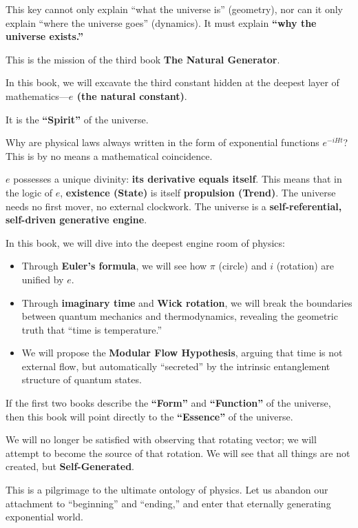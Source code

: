 \documentclass[11pt,a4paper,twoside]{book}
\begin{document}
This key cannot only explain ``what the universe is'' (geometry), nor can it only explain ``where the universe goes'' (dynamics). It must explain \textbf{``why the universe exists.''}

This is the mission of the third book \textbf{The Natural Generator}.

In this book, we will excavate the third constant hidden at the deepest layer of mathematics---\textbf{$e$ (the natural constant)}.

It is the \textbf{``Spirit''} of the universe.

Why are physical laws always written in the form of exponential functions $e^{-iHt}$? This is by no means a mathematical coincidence.

$e$ possesses a unique divinity: \textbf{its derivative equals itself}. This means that in the logic of $e$, \textbf{existence (State)} is itself \textbf{propulsion (Trend)}. The universe needs no first mover, no external clockwork. The universe is a \textbf{self-referential, self-driven generative engine}.

In this book, we will dive into the deepest engine room of physics:

\begin{itemize}
\item Through \textbf{Euler's formula}, we will see how $\pi$ (circle) and $i$ (rotation) are unified by $e$.

\item Through \textbf{imaginary time} and \textbf{Wick rotation}, we will break the boundaries between quantum mechanics and thermodynamics, revealing the geometric truth that ``time is temperature.''

\item We will propose the \textbf{Modular Flow Hypothesis}, arguing that time is not external flow, but automatically ``secreted'' by the intrinsic entanglement structure of quantum states.
\end{itemize}

If the first two books describe the \textbf{``Form''} and \textbf{``Function''} of the universe, then this book will point directly to the \textbf{``Essence''} of the universe.

We will no longer be satisfied with observing that rotating vector; we will attempt to become the source of that rotation. We will see that all things are not created, but \textbf{Self-Generated}.

This is a pilgrimage to the ultimate ontology of physics. Let us abandon our attachment to ``beginning'' and ``ending,'' and enter that eternally generating exponential world.
\end{document}
